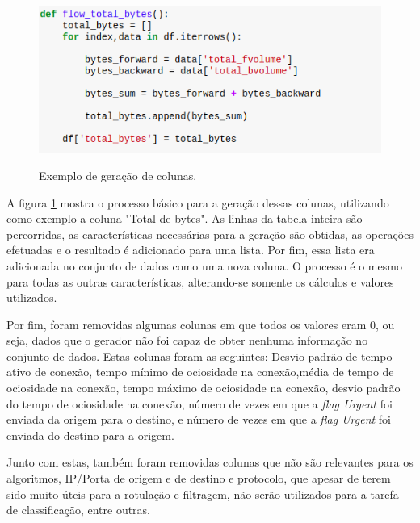 \begin{figure}[h]
\caption{\small Exemplo de geração de colunas.}
\centering
\includegraphics[scale=0.60]{figs/exemplo-geracao-coluna.png}
\label{f.exemplo-colunas}
\end{figure}

A figura \ref{f.exemplo-colunas} mostra o processo básico para a geração dessas colunas, utilizando como exemplo a coluna "Total de bytes". As linhas da tabela inteira são percorridas, as características necessárias para a geração são obtidas, as operações efetuadas e o resultado é adicionado para uma lista. Por fim, essa lista era adicionada no conjunto de dados como uma nova coluna. O processo é o mesmo para todas as outras características, alterando-se somente os cálculos e valores utilizados.

Por fim, foram removidas algumas colunas em que todos os valores eram 0, ou seja, dados que o gerador não foi capaz de obter nenhuma informação no conjunto de dados. Estas colunas foram as seguintes: Desvio padrão de tempo ativo de conexão, tempo mínimo de ociosidade na conexão,média de tempo de ociosidade na conexão, tempo máximo de ociosidade na conexão, desvio padrão do tempo de ociosidade na conexão, número de vezes em que a \textit{flag Urgent} foi enviada da origem para o destino, e número de vezes em que a \textit{flag Urgent}  foi enviada do destino para a origem.

Junto com estas, também foram removidas colunas que não são relevantes para os algoritmos, IP/Porta de origem e de destino e protocolo, que apesar de terem sido muito úteis para a rotulação e filtragem, não serão utilizados para a tarefa de classificação, entre outras.


